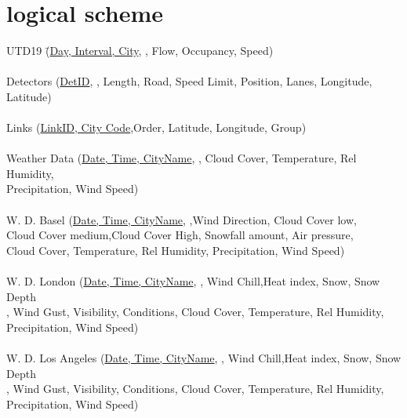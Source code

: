 \documentclass{article}
\begin{document}
\section{logical scheme}
\begin{center}
\begin{tabbing}
    UTD19 \qquad\qquad\qquad\= (\uline{Day, Interval, City},  , Flow, Occupancy, Speed)\\\\
    Detectors \> (\uline{DetID}, , Length, Road, Speed Limit, Position, Lanes, Longitude, Latitude)\\\\
    Links \> (\uline{LinkID, City Code},Order, Latitude, Longitude, Group)\\\\
    
    
    
    
    
    Weather Data \> (\uline{Date, Time, CityName},  , Cloud Cover, Temperature, Rel Humidity,\\ \> Precipitation, Wind Speed)\\\\
    
    W. D. Basel \> (\uline{Date, Time, CityName},  ,Wind Direction, Cloud Cover low,\\ \>  Cloud Cover medium,Cloud Cover 		High, Snowfall amount, Air pressure,\\ \> Cloud Cover, Temperature, Rel Humidity, Precipitation, Wind Speed)\\\\
    W. D. London \> (\uline{Date, Time, CityName}, , Wind Chill,Heat index, Snow, Snow Depth\\ \>, Wind Gust, Visibility, Conditions, Cloud Cover, Temperature, Rel Humidity,\\ \> Precipitation, Wind Speed)\\\\
    W. D. Los Angeles \> (\uline{Date, Time, CityName}, , Wind Chill,Heat index, Snow, Snow Depth\\ \>, Wind Gust, Visibility, Conditions, Cloud Cover, Temperature, Rel Humidity,\\ \> Precipitation, Wind Speed)\\
    \\
    

\end{tabbing}
\end{center}
\end{document}

